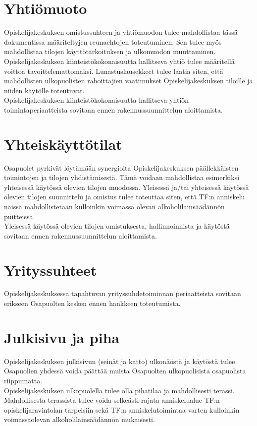 \documentclass[a4paper, 12pt, finnish]{report}
\begin{document}
\section*{Yhtiömuoto}
Opiskelijakeskuksen omistussuhteen ja yhtiömuodon tulee mahdollistaa tässä dokumentissa määriteltyjen reunaehtojen toteutuminen.
Sen tulee myös mahdollistaa tilojen käyttötarkoituksen ja ulkomuodon muuttaminen.
Opiskelijakeskuksen kiinteistökokonaisuutta hallitseva yhtiö tulee määritellä voittoa tavoittelemattomaksi.
Lunastuslausekkeet tulee laatia siten, että mahdollisten ulkopuolisten rahoittajien vaatimukset Opiskelijakeskuksen tiloille ja niiden käytölle toteutuvat.\\

Opiskelijakeskuksen kiinteistökokonaisuutta hallitseva yhtiön toimintaperiaatteista sovitaan ennen rakennussuunnittelun aloittamista.


\section*{Yhteiskäyttötilat}
Osapuolet pyrkivät löytämään synergioita Opiskelijakeskuksen päällekkäisten toimintojen ja tilojen yhdistämisestä.
Tämä voidaan mahdollistaa esimerkiksi yhteisessä käytössä olevien tilojen muodossa.
Yleisessä ja/tai yhteisessä käytössä olevien tilojen suunnittelu ja omistus tulee toteuttaa siten, että TF:n anniskelu näissä mahdollistetaan kulloinkin voimassa olevan alkoholilainsäädännön puitteissa.\\

Yleisessä käytössä olevien tilojen omistuksesta, hallinnoinnista ja käytöstä sovitaan ennen rakennussuunnittelun aloittamista.

\section*{Yrityssuhteet}
Opiskelijakeskuksessa tapahtuvan yrityssuhdetoiminnan periaatteista sovitaan erikseen Osapuolten kesken ennen hankkeen toteutumista.


\section*{Julkisivu ja piha}
Opiskelijakeskuksen julkisivun (seinät ja katto) ulkonäöstä ja käytöstä tulee Osapuolien yhdessä voida päättää muista Osapuolten ulkopuolisista osapuolista riippumatta.\\

Opiskelijakeskuksen ulkopuolella tulee olla pihatilaa ja mahdollisesti terassi.
Mahdollisesta terassista tulee voida selkeästi rajata anniskelualue TF:n opiskelijaravintolan tarpeisiin sekä TF:n anniskelutoimintaa varten kulloinkin voimassaolevan alkoholilainsäädännön mukaisesti.\\
\end{document}
